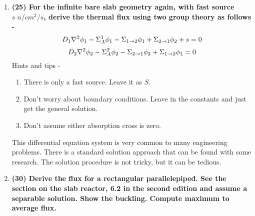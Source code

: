 \documentclass[11pt,a4paper]{article}
\begin{document}
\begin{enumerate}[leftmargin=*,topsep=0pt,font=\bfseries]
        \newpage 
    \item\textbf{(25) For the infinite bare slab geometry again, with fast source $s \; n/cm^2/s$, derive the thermal flux using two group theory as follows - }\\
        \begin{equation} \label{eq-fast-flux}
            \large D_1\nabla^2{\phi_1}-\Sigma_A^1\phi_1-\Sigma_{1 \rightarrow 2}\phi_1+\Sigma_{2 \rightarrow 1}\phi_2+s=0
        \end{equation}
        \begin{equation} \label{eq-thermal-flux}
            \large D_2\nabla^2{\phi_2}-\Sigma_A^2\phi_2-\Sigma_{2 \rightarrow 1}\phi_2+\Sigma_{1 \rightarrow 2}\phi_1=0
        \end{equation}
        \noindent Hints and tips - 
        \begin{enumerate}[leftmargin=*,topsep=0pt]
            \item There is only a fast source. Leave it as $S$.
            \item Don't worry about boundary conditions. Leave in the constants and just get the general solution.
            \item Don't assume either absorption cross is zero.
        \end{enumerate}
        \noindent This differential equation system is very common to many engineering problems. There is a standard solution approach that can be found with some research. The solution procedure is not tricky, but it can be tedious.  
        \vspace{0.25in}\\















        \newpage 
    \item\textbf{(30) Derive the flux for a rectangular parallelepiped. See the section on the slab reactor, 6.2 in the second edition and assume a separable solution. Show the buckling. Compute maximum to average flux.}
        \vspace{0.25in}\\






















\end{enumerate}
\end{document}
